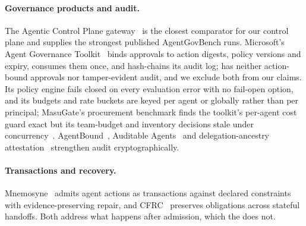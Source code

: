 \paragraph{Governance products and audit.} The Agentic Control Plane gateway~\cite{acp2026controlplane} is the closest comparator for our control plane and supplies the strongest published AgentGovBench runs. Microsoft's Agent Governance Toolkit~\cite{msagentgovernance} binds approvals to action digests, policy versions and expiry, consumes them once, and hash-chains its audit log; \method{} has neither action-bound approvals nor tamper-evident audit, and we exclude both from our claims. Its policy engine fails closed on every evaluation error with no fail-open option, and its budgets and rate buckets are keyed per agent or globally rather than per principal; MasuGate's procurement benchmark finds the toolkit's per-agent cost guard exact but its team-budget and inventory decisions stale under concurrency~\cite{peng2026statefulgov}. AgentBound~\cite{kaul2026agentbound}, Auditable Agents~\cite{nian2026auditable} and delegation-ancestry attestation~\cite{liu2026attesting} strengthen audit cryptographically.

\paragraph{Transactions and recovery.} Mnemosyne~\cite{chang2026mnemosyne} admits agent actions as transactions against declared constraints with evidence-preserving repair, and CFRC~\cite{deng2026donotrestart} preserves obligations across stateful handoffs. Both address what happens after admission, which the \gec{} does not.

